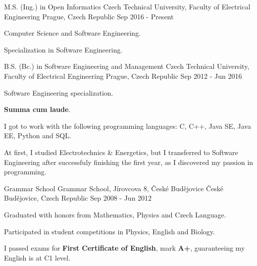 \begin{cventries}
  \cventry
    {M.S. (Ing.) in Open Informatics}
    {Czech Technical University, Faculty of Electrical Engineering}
    {Prague, Czech Republic}
    {Sep 2016 - Present}
    {
      \begin{cvitems}
        \item {Computer Science and Software Engineering.}
        \item {Specialization in Software Engineering.}
      \end{cvitems}
    }

  \cventry
    {B.S. (Bc.) in Software Engineering and Management}
    {Czech Technical University, Faculty of Electrical Engineering}
    {Prague, Czech Republic}
    {Sep 2012 - Jun 2016}
    {
      \begin{cvitems}
        \item {Software Engineering specialization.}
        \item {\textbf{Summa cum laude}.}
        \item {I got to work with the following programming languages: C, C++, Java SE, Java EE, Python and SQL.}
        \item {At first, I studied Electrotechnics \& Energetics, but I transferred to Software Engineering after successfuly finishing the first year, as I discovered my passion in programming.}
      \end{cvitems}
    }

  \cventry
    {Grammar School}
    {Grammar School, Jírovcova 8, České Budějovice}
    {České Budějovice, Czech Republic}
    {Sep 2008 - Jun 2012}
    {
      \begin{cvitems}
        \item {Graduated with honors from Mathematics, Physics and Czech Language.}
        \item {Participated in student competitions in Physics, English and Biology.}
        \item {I passed exams for \textbf{First Certificate of English}, mark \textbf{A+}, guaranteeing my English is at C1 level.}
      \end{cvitems}
    }
\end{cventries}
